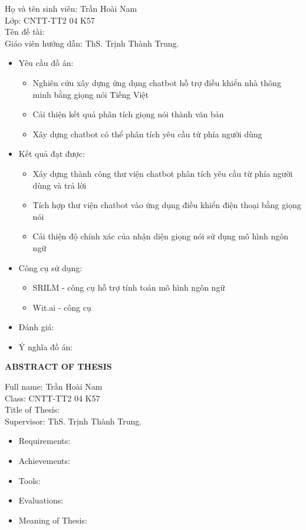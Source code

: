 \documentclass[12pt]{report}
\begin{document}
\noindent Họ và tên sinh viên: Trần Hoài Nam \\
Lớp: CNTT-TT2 04 K57\\
Tên đề tài: \\
Giáo viên hướng dẫn: ThS. Trịnh Thành Trung.
\begin{itemize}
	\item Yêu cầu đồ án:
		\begin{itemize}
			\item Nghiên cứu xây dựng ứng dụng chatbot hỗ trợ điều khiển nhà thông minh bằng giọng nói Tiếng Việt
			\item Cải thiện kết quả phân tích giọng nói thành văn bản
			\item Xây dựng chatbot có thể phân tích yêu cầu từ phía người dùng
		\end{itemize}
	\item Kết quả đạt được:
		\begin{itemize}
			\item Xây dựng thành công thư viện chatbot phân tích yêu cầu từ phía người dùng và trả lời
			\item Tích hợp thư viện chatbot vào ứng dụng điều khiển điện thoại bằng giọng nói
			\item Cải thiện độ chính xác của nhận diện giọng nói sử dụng mô hình ngôn ngữ
		\end{itemize}
	\item Công cụ sử dụng:
		\begin{itemize}
			
			\item SRILM - công cụ hỗ trợ tính toán mô hình ngôn ngữ
			\item Wit.ai - công cụ 
		\end{itemize}
	\item Đánh giá:
	\item Ý nghĩa đồ án:
\end{itemize}

\newpage

\begin{center}
{\large \textbf{ABSTRACT OF THESIS}}
\end{center}

\noindent Full name: Trần Hoài Nam \\
Class: CNTT-TT2 04 K57\\
Title of Thesis: \\
Supervisor: ThS. Trịnh Thành Trung.
\begin{itemize}
	\item Requirements:
	\item Achievements:
	\item Tools:
	\item Evaluations:
	\item Meaning of Thesis:
\end{itemize}
\end{document}
